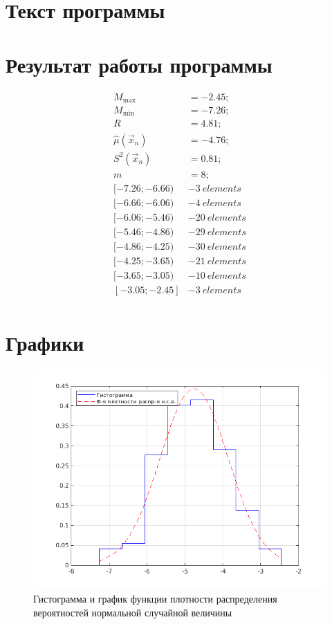 \section{Текст программы}




\section{Результат работы программы}
\begin{align*}
	M_{\max}          &= -2.45; \\
	M_{\min}          &= -7.26; \\
	R                 &= 4.81;  \\
	\hat\mu(\vec x_n) &= -4.76; \\
	S^2(\vec x_n)     &= 0.81;  \\
	m                 &= 8;		\\
	[ -7.26 ; -6.66 ) &- 3\:elements	\\
	[ -6.66 ; -6.06 ) &- 4\:elements	\\
	[ -6.06 ; -5.46 ) &- 20\:elements	\\
	[ -5.46 ; -4.86 ) &- 29\:elements	\\
	[ -4.86 ; -4.25 ) &- 30\:elements	\\
	[ -4.25 ; -3.65 ) &- 21\:elements	\\
	[ -3.65 ; -3.05 ) &- 10\:elements	\\
	[ -3.05 ; -2.45 ] &- 3\:elements	\\
\end{align*}


\section{Графики}
\begin{figure}[pt!]
	\centering
	\includegraphics{../img/figure1}
	\caption{Гистограмма и график функции плотности распределения вероятностей нормальной случайной величины}
\end{figure}

